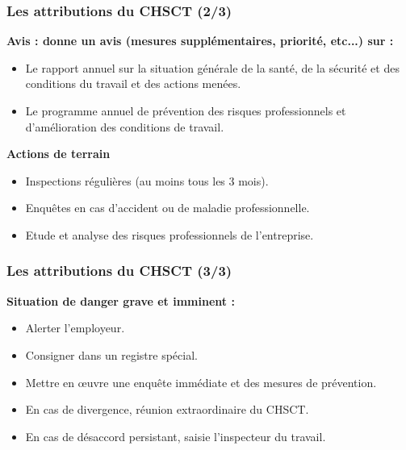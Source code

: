 \documentclass{beamer}
\begin{document}
\begin{frame}
\frametitle{Les attributions du CHSCT (2/3)}

\textbf{Avis : donne un avis (mesures supplémentaires, priorité, etc...)  sur :}

\begin{itemize}
        \item Le rapport annuel sur la situation générale de la santé, de la sécurité et des conditions du travail et des actions menées.
        \item Le programme annuel de prévention des risques professionnels et d'amélioration des conditions de travail.
\end{itemize}

\textbf{Actions de terrain}

\begin{itemize}
\item Inspections régulières (au moins tous les 3 mois). 

        \item Enquêtes en cas d'accident ou de maladie professionnelle.

        \item Etude et analyse des risques professionnels de l'entreprise.
\end{itemize}
\end{frame}

\begin{frame}
\frametitle{Les attributions du CHSCT (3/3)}

\textbf{Situation de danger grave et imminent :}

\begin{itemize}
        \item Alerter l'employeur.

        \item Consigner dans un registre spécial.

\item Mettre en œuvre une enquête immédiate et des mesures de prévention.

\item En cas de divergence, réunion extraordinaire du CHSCT.

        \item En cas de désaccord persistant, saisie l'inspecteur du travail.
\end{itemize}
\end{frame}
\end{document}
